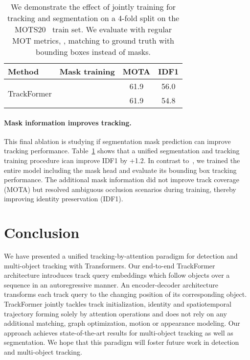 \documentclass[10pt,twocolumn,letterpaper]{article}
\newcommand{\tablestyle}[2]{\setlength{\tabcolsep}{#1}\renewcommand{\arraystretch}{#2}\centering\footnotesize}
\newcommand{\tabref}[1]{Table~\ref{#1}}
\begin{document}
\begin{table}
    \tablestyle{1.2pt}{1.05}
         \vspace{-10pt}
    \begin{center}
        \begin{tabular}[t]{lc cc}
            \toprule
            Method    &  Mask training                          & MOTA  & IDF1  \\

            \midrule
            \multirow{2}{*}{TrackFormer}    &          & 61.9 & 56.0 \\
                                            &                           & 61.9 & 54.8 \\


            \bottomrule
        \end{tabular}
    \end{center}
\caption{
        We demonstrate the effect of jointly training for tracking and segmentation on a 4-fold split on the MOTS20~\cite{MOTS} train set.
We evaluate with regular MOT metrics, \ie, matching to ground truth with bounding boxes instead of masks.
    }
     \vspace{-10pt}
\label{tab:ablation_mots}
\end{table} 
\paragraph{Mask information improves tracking.}
This final ablation is studying if  segmentation mask prediction can improve tracking performance.
\tabref{tab:ablation_mots} shows that  a unified segmentation and tracking training procedure ican improve IDF1 by +1.2. 
In contrast to~\cite{DETR}, we trained the entire model including the mask head and evaluate its bounding box tracking performance.
The additional mask information did not improve track coverage (MOTA) but resolved ambiguous occlusion scenarios during training, thereby improving identity preservation (IDF1).
 \section{Conclusion}

We have presented a unified tracking-by-attention paradigm for detection and multi-object tracking with Transformers.
Our end-to-end TrackFormer architecture introduces track query embeddings which follow objects over a sequence in an autoregressive manner.
An encoder-decoder architecture transforms each track query to the changing position of its corresponding object.
\mbox{TrackFormer} jointly tackles track initialization, identity and spatiotemporal trajectory forming solely by attention operations and does not rely on any additional matching, graph optimization, motion or appearance modeling.
Our approach achieves state-of-the-art results for multi-object tracking as well as segmentation.
We hope that  this paradigm will foster future work in detection and multi-object tracking.  
\ificcvfinal
\end{document}
